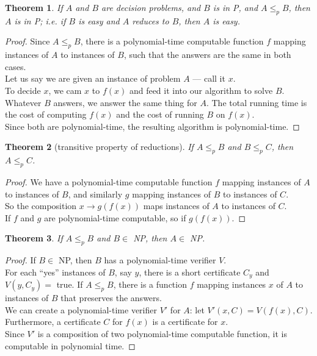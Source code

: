 \documentclass[12pt]{article}
\theoremstyle{plain}
\newtheorem{theorem}{Theorem}[subsection]
\theoremstyle{definition}
\begin{document}
\begin{theorem}
If $A$ and $B$ are decision problems, and $B$ is in P, and $A \leq_{p} B$, then $A$ is in P;
i.e. if $B$ is easy and $A$ reduces to $B$, then $A$ is easy.
\end{theorem}
\begin{proof}
Since $A \leq_{p} B$, there is a polynomial-time computable function $f$ mapping instances of $A$ to instances of $B$, such that the answers are the same in both cases. \\
Let us say we are given an instance of problem $A$ --- call it $x$. \\
To decide $x$, we cam $x$ to $f(x)$ and feed it into our algorithm to solve $B$.
Whatever $B$ answers, we answer the same thing for $A$.
The total running time is the cost of computing $f(x)$ and the cost of running $B$ on $f(x)$. \\
Since both are polynomial-time, the resulting algorithm is polynomial-time.
\end{proof}

\begin{theorem}[transitive property of reductions]
If $A \leq_{p} B$ and $B \leq_{p} C$, then $A \leq_{p} C$.
\end{theorem}
\begin{proof}
We have a polynomial-time computable function $f$ mapping instances of $A$ to instances of $B$, and similarly $g$ mapping instances of $B$ to instances of $C$. \\
So the composition $x \to g(f(x))$ maps instances of $A$ to instances of $C$. \\
If $f$ and $g$ are polynomial-time computable, so if $g(f(x))$.
\end{proof}

\begin{theorem}
If $A \leq_{p} B$ and $B \in$ NP, then $A \in$ NP.
\end{theorem}
\begin{proof}
If $B \in$ NP, then $B$ has a polynomial-time verifier $V$. \\
For each ``yes'' instances of $B$, say $y$, there is a short certificate $C_{y}$ and $V(y, C_{y}) =$ true.
If $A \leq_{p} B$, there is a function $f$ mapping instances $x$ of $A$ to instances of $B$ that preserves the answers. \\
We can create a polynomial-time verifier $V'$ for $A$: let $V'(x, C) = V(f(x), C)$.
Furthermore, a certificate $C$ for $f(x)$ is a certificate for $x$. \\
Since $V'$ is a composition of two polynomial-time computable function, it is computable in polynomial time.
\end{proof}
\end{document}
